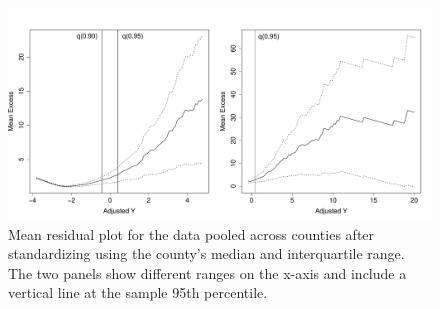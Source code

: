 \documentclass[11pt]{article}
\begin{document}
\begin{figure}[htbp]  %
  \centering
  \includegraphics[width = \linewidth]{plots/fire-mrl-plots.pdf}
  \caption{Mean residual plot for the data pooled across counties after standardizing using the county's median and interquartile range. The two panels show different ranges on the x-axis and include a vertical line at the sample 95th percentile.}
  \label{ebfig:mrlthresh}
\end{figure}

\end{document}
